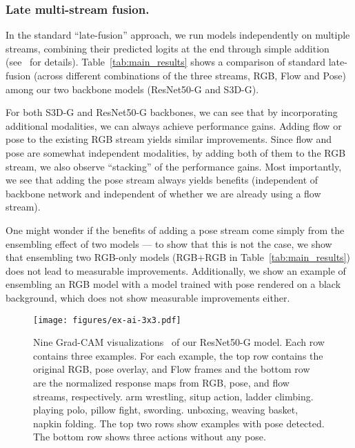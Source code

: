 \documentclass[letterpaper]{article} \usepackage{aaai21}  \usepackage{times}  \usepackage{helvet} \usepackage{courier}  \usepackage[hyphens]{url}  \usepackage{graphicx} \urlstyle{rm} \def\UrlFont{\rm}  \usepackage{natbib}  \usepackage{caption} \frenchspacing  \setlength{\pdfpagewidth}{8.5in}  \setlength{\pdfpageheight}{11in}
\begin{document}
\subsubsection{Late multi-stream fusion.}
In the standard ``late-fusion'' approach, we run models independently on multiple streams, combining their predicted logits at the end through simple 
addition (see~\citet{feichtenhofer2016convolutional} for details).
Table~\ref{tab:main_results} shows a comparison of standard late-fusion (across different combinations of the three streams, RGB, Flow and Pose) 
among our two backbone models (ResNet50-G and S3D-G). 

For both  S3D-G and ResNet50-G backbones, we can see that by incorporating additional modalities, we can always achieve performance gains. Adding flow or pose to the existing RGB stream yields similar improvements. Since flow and pose are somewhat independent modalities, by adding both of them to the RGB stream, we also observe ``stacking'' 
of the performance gains.  Most importantly, we see that adding the pose stream always yields benefits (independent of backbone network and independent of whether we are already using a flow stream). 



One might wonder if the benefits of adding a pose stream come simply from the ensembling effect of two models --- to show that this is not the case, we show that 
ensembling two RGB-only models (RGB+RGB in Table~\ref{tab:main_results}) does
not lead to measurable improvements. Additionally, we show an example of ensembling an RGB model with a model trained with 
pose rendered on a black background, which does not show measurable improvements either.



\begin{figure*}[!htb]
    \centering
    \texttt{[image: figures/ex-ai-3x3.pdf]}
    \caption{\footnotesize Nine Grad-CAM visualizations~\cite{selvaraju2017grad} of our ResNet50-G model. Each row contains three examples. For each example, the top row contains the original RGB, pose overlay, and Flow frames and the bottom row are the normalized response maps from RGB, pose, and flow streams, respectively.
    {} arm wrestling, situp action, ladder climbing.
    {} playing polo, pillow fight, swording.
    {} unboxing, weaving basket, napkin folding.
    The top two rows show examples with pose detected. The bottom row shows three actions without any pose. }
    \label{fig:ex-ai}
\vspace{-0.3cm}
\end{figure*}
\end{document}
